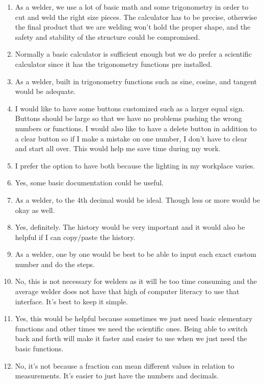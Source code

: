 \begin{itemize}
\begin{enumerate}
                        \item As a welder, we use a lot of basic math and some trigonometry in order to cut and weld the right size pieces. The calculator has to be precise, otherwise the final product that we are welding won’t hold the proper shape, and the safety and stability of the structure could be compromised.
                        \item Normally a basic calculator is sufficient enough but we do prefer a scientific calculator since it has the trigonometry functions pre installed.
                        \item As a welder, built in trigonometry functions such as sine, cosine, and tangent would be adequate.
                        \item I would like to have some buttons customized such as a larger equal sign. Buttons should be large so that we have no problems pushing the wrong numbers or functions. I would also like to have a delete button in addition to a clear button so if I make a mistake on one number, I don’t have to clear and start all over. This would help me save time during my work.
                        \item I prefer the option to have both because the lighting in my workplace varies.
                        \item Yes, some basic documentation could be useful.
                        \item As a welder, to the 4th decimal would be ideal. Though less or more would be okay as well.
                        \item Yes, definitely. The history would be very important and it would also be helpful if I can copy/paste the history.
                        \item As a welder, one by one would be best to be able to input each exact custom number and do the steps.
                        \item No, this is not necessary for welders as it will be too time consuming and the average welder does not have that high of computer literacy to use that interface. It’s best to keep it simple.
                       \item Yes, this would be helpful because sometimes we just need basic elementary functions and other times we need the scientific ones. Being able to switch back and forth will make it faster and easier to use when we just need the basic functions.
                        \item No, it’s not because a fraction can mean different values in relation to measurements. It’s easier to just have the numbers and decimals.

\end{enumerate}
\end{itemize}
